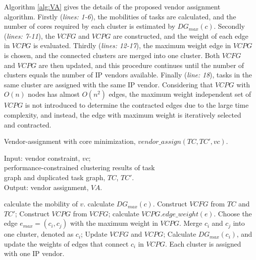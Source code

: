 \documentclass[10pt,journal]{IEEEtran}
\begin{document}

Algorithm \ref{alg:VA} gives the details of the proposed vendor assignment algorithm. Firstly (\textit{lines: 1-6}), the mobilities of tasks are calculated, and the number of cores required by each cluster is estimated by $DG_{max}(c)$. Secondly (\textit{lines: 7-11}), the $VCFG$ and $VCPG$ are constructed, and the weight of each edge in $VCPG$ is evaluated. Thirdly (\textit{lines: 12-17}), the maximum weight edge in $VCPG$ is chosen, and the connected clusters are merged into one cluster. Both $VCFG$ and $VCPG$ are then updated, and this procedure continues until the number of clusters equals the number of IP vendors available. Finally (\textit{line: 18}), tasks in the same cluster are assigned with the same IP vendor. Considering that $VCPG$ with $O(n)$ nodes has almost $O(n^2)$ edges, the maximum weight independent set of $VCPG$ is not introduced to determine the contracted edges due to the large time complexity, and instead, the edge with maximum weight is iteratively selected and contracted.


\begin{algorithm}[!h]
\caption{Vendor-assignment with core minimization, $vendor\_assign(TC, TC', vc)$.}
\label{alg:VA}
{Input:}
vendor constraint, $vc$; \\
\hspace*{2.8em} performance-constrained clustering results of task\\
\hspace*{2.8em}  graph and duplicated task graph, $TC$, $TC'$.\\
{Output:} vendor assignment, $VA$.
\begin{algorithmic}[1]
    \STATE calculate the mobility of $v$.
\ENDFOR
{}
    \STATE calculate $DG_{max}(c)$.
\ENDFOR
\STATE Construct $VCFG$ from $TC$ and $TC'$;
\STATE Construct $VCPG$ from $VCFG$;
    \STATE calculate $VCPG.edge\_weight(e)$.
\ENDFOR
{}
\STATE Choose the edge $e_{max}=(c_i,c_j)$ with the maximum weight in $VCPG$.
\STATE Merge $c_i$ and $c_j$ into one cluster, denoted as $c_{i}$;
\STATE Update $VCFG$ and $VCPG$;
\STATE Calculate $DG_{max}(c_i)$, and update the weights of edges that connect $c_i$ in $VCPG$.
\ENDWHILE
\STATE Each cluster is assigned with one IP vendor.
\end{algorithmic}
\end{algorithm}
\end{document}
